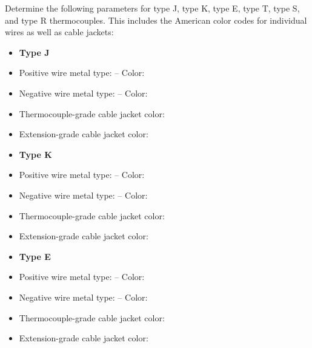

Determine the following parameters for type J, type K, type E, type T, type S, and type R thermocouples.  This includes the American color codes for individual wires as well as cable jackets:

\begin{itemize}
\item{} {\bf Type J}
\item{} Positive wire metal type: \underbar{\hskip 50pt} -- Color: \underbar{\hskip 50pt} 
\item{} Negative wire metal type: \underbar{\hskip 50pt} -- Color: \underbar{\hskip 50pt} 
\item{} Thermocouple-grade cable jacket color: \underbar{\hskip 50pt} 
\item{} Extension-grade cable jacket color: \underbar{\hskip 50pt} 
\end{itemize}

\begin{itemize}
\item{} {\bf Type K}
\item{} Positive wire metal type: \underbar{\hskip 50pt} -- Color: \underbar{\hskip 50pt} 
\item{} Negative wire metal type: \underbar{\hskip 50pt} -- Color: \underbar{\hskip 50pt} 
\item{} Thermocouple-grade cable jacket color: \underbar{\hskip 50pt} 
\item{} Extension-grade cable jacket color: \underbar{\hskip 50pt} 
\end{itemize}

\begin{itemize}
\item{} {\bf Type E}
\item{} Positive wire metal type: \underbar{\hskip 50pt} -- Color: \underbar{\hskip 50pt} 
\item{} Negative wire metal type: \underbar{\hskip 50pt} -- Color: \underbar{\hskip 50pt} 
\item{} Thermocouple-grade cable jacket color: \underbar{\hskip 50pt} 
\item{} Extension-grade cable jacket color: \underbar{\hskip 50pt} 
\end{itemize}

